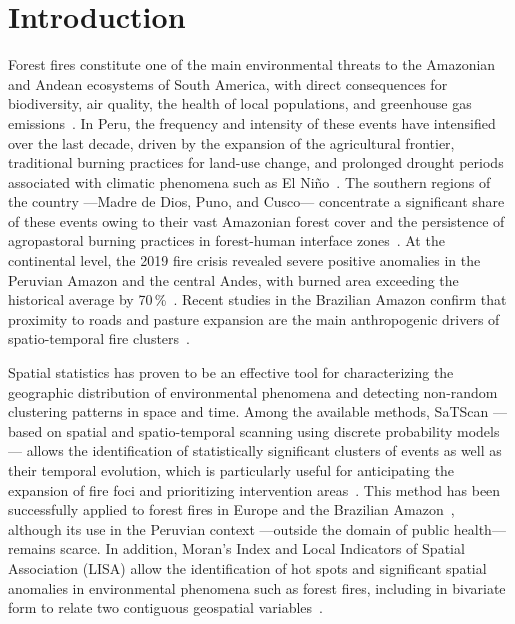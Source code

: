 \documentclass[preprint,12pt,authoryear]{elsarticle}
\begin{document}
	\section{Introduction}
	
	Forest fires constitute one of the main environmental threats to
	the Amazonian and Andean ecosystems of South America, with direct
	consequences for biodiversity, air quality, the health of local
	populations, and greenhouse gas emissions~\citep{Aragao2018,Nepstad1999,Cochrane2003}.
	In Peru, the frequency and intensity of these events have
	intensified over the last decade, driven by the expansion of the
	agricultural frontier, traditional burning practices for land-use
	change, and prolonged drought periods associated with climatic
	phenomena such as El Ni\~no~\citep{SERFOR2023,Mostiga2026,Marengo2011}.
	The southern regions of the country ---Madre de Dios, Puno, and
	Cusco--- concentrate a significant share of these events owing to
	their vast Amazonian forest cover and the persistence of
	agropastoral burning practices in forest-human interface
	zones~\citep{MINAM2024,Barboza2024,Zubieta2021}. At the continental
	level, the 2019 fire crisis revealed severe positive anomalies in
	the Peruvian Amazon and the central Andes, with burned area
	exceeding the historical average by 70\,\%~\citep{Lizundia2020}.
	Recent studies in the Brazilian Amazon confirm that proximity to
	roads and pasture expansion are the main anthropogenic drivers of
	spatio-temporal fire clusters~\citep{Valente2023,Raiol2026,BolanoDiaz2022}.
	
	Spatial statistics has proven to be an effective tool for
	characterizing the geographic distribution of environmental
	phenomena and detecting non-random clustering patterns in space and
	time. Among the available methods, SaTScan ---based on spatial and
	spatio-temporal scanning using discrete probability models---
	allows the identification of statistically significant clusters of
	events as well as their temporal evolution, which is particularly
	useful for anticipating the expansion of fire foci and prioritizing
	intervention areas~\citep{Kulldorff1997,Kulldorff2001,VegaOrozco2012,Urfali2025,Zerbe2022}.
	This method has been successfully applied to forest fires in Europe
	and the Brazilian Amazon~\citep{VegaOrozco2012,Valente2023}, although
	its use in the Peruvian context ---outside the domain of public
	health--- remains scarce. In addition, Moran's Index and Local
	Indicators of Spatial Association (LISA) allow the identification of
	hot spots and significant spatial anomalies in environmental
	phenomena such as forest fires, including in bivariate form to
	relate two contiguous geospatial
	variables~\citep{Anselin1995,Ma2022,Atalay2025}.
	
\end{document}
